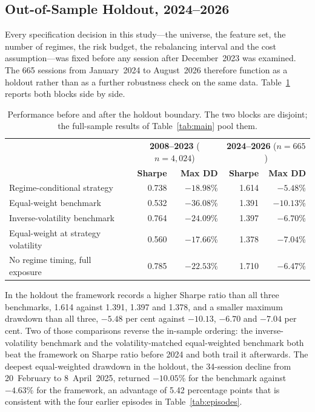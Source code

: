 \documentclass{singlecol-new}
\theoremstyle{TH}{
\newtheorem{lemma}{Lemma}
\newtheorem{theorem}[lemma]{Theorem}
\newtheorem{corrolary}[lemma]{Corrolary}
\newtheorem{conjecture}[lemma]{Conjecture}
\newtheorem{proposition}[lemma]{Proposition}
\newtheorem{claim}[lemma]{Claim}
\newtheorem{stheorem}[lemma]{Wrong Theorem}
\newtheorem{algorithm}{Algorithm}
}
\theoremstyle{THrm}{
\newtheorem{definition}{Definition}[section]
\newtheorem{question}{Question}[section]
\newtheorem{remark}{Remark}
\newtheorem{scheme}{Scheme}
}
\theoremstyle{THhit}{
\newtheorem{case}{Case}[section]
}
\begin{document}
\subsection{Out-of-Sample Holdout, 2024--2026}
\label{sec:holdout}

Every specification decision in this study---the universe, the feature set, the number of
regimes, the risk budget, the rebalancing interval and the cost assumption---was fixed
before any session after December~2023 was examined. The 665 sessions from January~2024
to August~2026 therefore function as a holdout rather than as a further robustness check
on the same data. Table~\ref{tab:holdout} reports both blocks side by side.

\begin{table}[!ht]
\centering
\caption{Performance before and after the holdout boundary. The two blocks are disjoint;
the full-sample results of Table~\ref{tab:main} pool them.}
\label{tab:holdout}
\small
\begin{tabular}{p{4.9cm}rrrr}
\hline
& \multicolumn{2}{c}{\textbf{2008--2023} ($n=4{,}024$)} & \multicolumn{2}{c}{\textbf{2024--2026} ($n=665$)} \\
& \textbf{Sharpe} & \textbf{Max DD} & \textbf{Sharpe} & \textbf{Max DD} \\
\hline
Regime-conditional strategy & 0.738 & $-18.98$\% & 1.614 & $-5.48$\% \\
Equal-weight benchmark & 0.532 & $-36.08$\% & 1.391 & $-10.13$\% \\
Inverse-volatility benchmark & 0.764 & $-24.09$\% & 1.397 & $-6.70$\% \\
Equal-weight at strategy volatility & 0.560 & $-17.66$\% & 1.378 & $-7.04$\% \\
No regime timing, full exposure & 0.785 & $-22.53$\% & 1.710 & $-6.47$\% \\
\hline
\end{tabular}
\end{table}

In the holdout the framework records a higher Sharpe ratio than all three benchmarks,
1.614 against 1.391, 1.397 and 1.378, and a smaller maximum drawdown than all three,
$-5.48$ per cent against $-10.13$, $-6.70$ and $-7.04$ per cent. Two of those comparisons
reverse the in-sample ordering: the inverse-volatility benchmark and the
volatility-matched equal-weighted benchmark both beat the framework on Sharpe ratio
before 2024 and both trail it afterwards. The deepest equal-weighted drawdown in the
holdout, the 34-session decline from 20~February to 8~April~2025, returned $-10.05$\% for
the benchmark against $-4.63$\% for the framework, an advantage of 5.42 percentage points
that is consistent with the four earlier episodes in Table~\ref{tab:episodes}.
\end{document}
